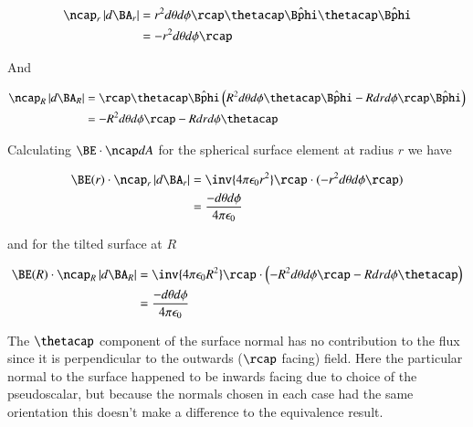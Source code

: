 \documentclass{article}
\newcommand{\phicap}[0]{\hat{\Bphi}}
\begin{document}
\begin{align*}
\ncap_r \Abs{d\BA_r}
&= r^2 d\theta d\phi \rcap \thetacap \phicap \thetacap\phicap \\
&= -r^2 d\theta d\phi \rcap \\
\end{align*}

And

\begin{align*}
\ncap_R \Abs{d\BA_R}
&= \rcap \thetacap \phicap \left( R^2 d\theta d\phi \thetacap \phicap - R dr d\phi \rcap \phicap \right) \\
&= - R^2 d\theta d\phi \rcap - R dr d\phi \thetacap
\end{align*}

Calculating $\BE \cdot \ncap dA$ for the spherical surface element at radius $r$ we have

\begin{align*}
\BE(r) \cdot \ncap_r \Abs{d\BA_r}
&= \inv{4 \pi \epsilon_0 r^2} \rcap \cdot (-r^2 d\theta d\phi \rcap) \\
&= \frac{-d\theta d\phi}{4 \pi \epsilon_0}
\end{align*}

and for the tilted surface at $R$ 

\begin{align*}
\BE(R) \cdot \ncap_R \Abs{d\BA_R}
&= \inv{4 \pi \epsilon_0 R^2} \rcap \cdot \left(- R^2 d\theta d\phi \rcap - R dr d\phi \thetacap \right) \\
&= \frac{-d\theta d\phi}{4 \pi \epsilon_0}
\end{align*}

The $\thetacap$ component of the surface normal has no contribution to the flux since it is perpendicular to the outwards ($\rcap$ facing) field.  Here the particular normal to the surface happened to be inwards facing due to choice of the pseudoscalar, but because the normals chosen in each case had the same orientation this doesn't make a difference to the equivalence result.



\end{document}
